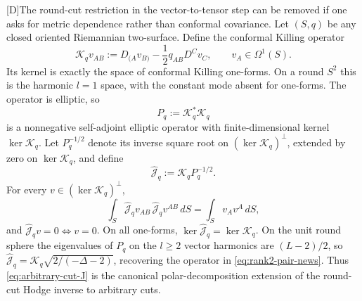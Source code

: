 \documentclass[11pt,a4paper]{article}
\newcommand{\statusD}{\textsf{[D]}}
\begin{document}
\statusD The round-cut restriction in the vector-to-tensor step can be removed if one asks for metric dependence rather than conformal covariance.  Let \((S,q)\) be any closed oriented Riemannian two-surface.  Define the conformal Killing operator
\begin{equation}\label{eq:arbitrary-cut-K}
  \mathcal K_q v_{AB}
  :=
  D_{(A}v_{B)}-\frac12q_{AB}D^Cv_C ,
  \qquad
  v_A\in\Omega^1(S).
\end{equation}
Its kernel is exactly the space of conformal Killing one-forms.  On a round \(S^2\) this is the harmonic \(l=1\) space, with the constant mode absent for one-forms.  The operator is elliptic, so
\begin{equation}
  P_q:=\mathcal K_q^\ast\mathcal K_q
\end{equation}
is a nonnegative self-adjoint elliptic operator with finite-dimensional kernel \(\ker\mathcal K_q\).  Let \(P_q^{-1/2}\) denote its inverse square root on \((\ker\mathcal K_q)^\perp\), extended by zero on \(\ker\mathcal K_q\), and define
\begin{equation}\label{eq:arbitrary-cut-J}
  \widehat{\mathcal J}_q
  :=
  \mathcal K_q P_q^{-1/2}.
\end{equation}
For every \(v\in(\ker\mathcal K_q)^\perp\),
\begin{equation}\label{eq:arbitrary-cut-isometry}
  \int_S
  \widehat{\mathcal J}_q v_{AB}\,
  \widehat{\mathcal J}_q v^{AB}\,dS
  =
  \int_S v_Av^A\,dS ,
\end{equation}
and \(\widehat{\mathcal J}_qv=0\iff v=0\).  On all one-forms, \(\ker\widehat{\mathcal J}_q=\ker\mathcal K_q\).  On the unit round sphere the eigenvalues of \(P_q\) on the \(l\ge2\) vector harmonics are \((L-2)/2\), so \(\widehat{\mathcal J}_q=\mathcal K_q\sqrt{2/(-\Delta-2)}\), recovering the operator in \eqref{eq:rank2-pair-news}.  Thus \eqref{eq:arbitrary-cut-J} is the canonical polar-decomposition extension of the round-cut Hodge inverse to arbitrary cuts.
\end{document}
